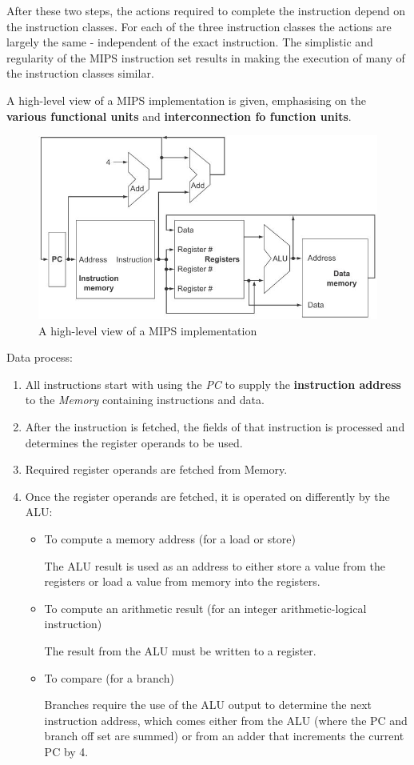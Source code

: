 \documentclass[10pt,a4paper]{article}
\begin{document}
After these two steps, the actions required to complete the instruction depend on the instruction
classes. For each of the three instruction classes the actions are largely the same - independent of
the exact instruction. The simplistic and regularity of the MIPS instruction set results in making
the execution of many of the instruction classes similar.

A high-level view of a MIPS implementation is given, emphasising on the \textbf{various functional
units}  and \textbf{interconnection fo function units}. 
\begin{figure} [h!]
    \centering
    \includegraphics[scale=0.7]{High level MIPS view.JPG}
    \caption{A high-level view of a MIPS implementation}
\end{figure}

Data process:
\begin{enumerate}
    \item All instructions start with using the \textit{PC} to supply the \textbf{instruction
    address} to the \textit{Memory} containing instructions and data.
    \item After the instruction is fetched, the fields of that instruction is processed and
    determines the register operands to be used.
    \item Required register operands are fetched from Memory.
    \item  Once the register operands are fetched, it is operated on differently by the ALU:
    \begin{itemize}
        \item To compute a memory address (for a load or store)
        
        The ALU result is used as an address to either store a value from the registers or load a value from memory into the registers.
        \item To compute an arithmetic result (for an integer arithmetic-logical instruction)
        
        The result from the ALU must be written to a register.
        \item To compare (for a branch)
        
        Branches require the use of the ALU output to determine the next instruction 
        address, which comes either from the ALU (where the PC and branch off set are summed) or from an adder that increments the current PC by 4.
    \end{itemize}
\end{enumerate}
\end{document}
